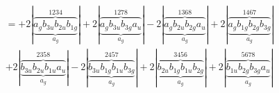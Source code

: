 \documentclass{article}
\begin{document}
\begin{multline*}
=+2\left|\underbrace{\overbrace{a_{g} b_{3u} b_{2u} b_{1g}}^{1 2 3 4}}_{a_{g}}\right|+2\left|\underbrace{\overbrace{a_{g} b_{3u} b_{3g} a_{u}}^{1 2 7 8}}_{a_{g}}\right|-2\left|\underbrace{\overbrace{a_{g} b_{2u} b_{2g} a_{u}}^{1 3 6 8}}_{a_{g}}\right|+2\left|\underbrace{\overbrace{a_{g} b_{1g} b_{2g} b_{3g}}^{1 4 6 7}}_{a_{g}}\right|\\
+2\left|\underbrace{\overbrace{b_{3u} b_{2u} b_{1u} a_{u}}^{2 3 5 8}}_{a_{g}}\right|-2\left|\underbrace{\overbrace{b_{3u} b_{1g} b_{1u} b_{3g}}^{2 4 5 7}}_{a_{g}}\right|+2\left|\underbrace{\overbrace{b_{2u} b_{1g} b_{1u} b_{2g}}^{3 4 5 6}}_{a_{g}}\right|+2\left|\underbrace{\overbrace{b_{1u} b_{2g} b_{3g} a_{u}}^{5 6 7 8}}_{a_{g}}\right|
\end{multline*}
\\\\
\end{document}
